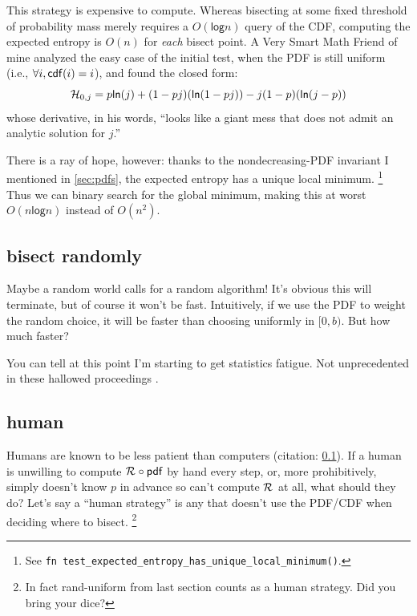 \documentclass[11pt]{sigplanconf}
\begin{document}
This strategy is expensive to compute.
Whereas bisecting at some fixed threshold of probability mass merely requires a $O(\mathsf{log}  n)$ query of the CDF,
computing the expected entropy is $O(n)$ for {\it each} bisect point.
A Very Smart Math Friend of mine \cite{primer} analyzed the easy case of the initial test,
when the PDF is still uniform (i.e., $\forall i, \mathsf{cdf}(i) = i$),
and found the closed form:
\[
	\mathcal{H}_{0,j} = p \mathsf{ln}(j)
	+
	(1-pj) (\mathsf{ln} (1-pj))
	-
	j(1-p) (\mathsf{ln} (j-p))
\]
whose derivative,
in his words,
``looks like a giant mess that does not admit an analytic solution for $j$.''


There is a ray of hope, however:
thanks to the nondecreasing-PDF invariant I mentioned in \cref{sec:pdfs}, %
the expected entropy has a unique local minimum.%
\footnote{See {\tt fn test\_expected\_entropy\_has\_unique\_local\_minimum()}.}
Thus we can binary search for the global minimum, making this at worst $O(n\mathsf{log}n)$
instead of $O(n^2)$.

\subsection{bisect randomly}
\label{sec:random}

Maybe a random world calls for a random algorithm!
It's obvious this will terminate, but of course it won't be fast.
Intuitively, if we use the PDF to weight the random choice, it will be faster than choosing uniformly in $[0,b)$.
But how much faster?

You can tell at this point I'm starting to get statistics fatigue.
Not unprecedented in these hallowed proceedings \cite{batch-myass}.

\subsection{human}
\label{sec:human}

Humans are known to be less patient than computers (citation: \cref{sec:random}).
If a human is unwilling to compute $\mathcal{R}_{} \circ \mathsf{pdf}$ by hand every step,
or, more prohibitively,
simply doesn't know $p$ in advance so can't compute $\mathcal{R}_{}$ at all,
what should they do?
Let's say a ``human strategy'' is any that doesn't use the PDF/CDF when deciding where to bisect.%
\footnote{In fact {\sf rand-uniform} from last section counts as a human strategy. Did you bring your dice?}
\end{document}

